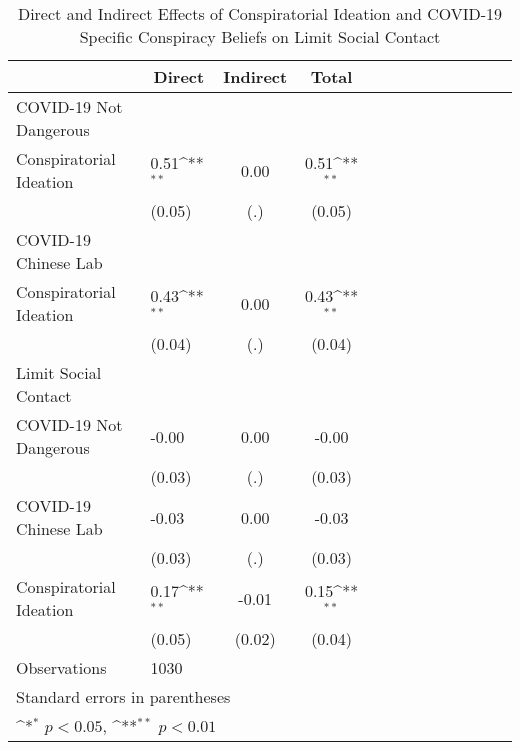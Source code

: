 \begin{table}[htbp]\centering
\def\sym#1{\ifmmode^{#1}\else\(^{#1}\)\fi}
\caption{Direct and Indirect Effects of Conspiratorial Ideation and COVID-19 Specific Conspiracy Beliefs on Limit Social Contact}
\begin{tabular}{l*{3}{l c c c}}
\hline\hline
                    &\multicolumn{1}{c}{Direct}&\multicolumn{1}{c}{Indirect}&\multicolumn{1}{c}{Total}\\
\hline
COVID-19 Not Dangerous&                    &                    &                    \\
Conspiratorial Ideation&        0.51\sym{**}&        0.00        &        0.51\sym{**}\\
                    &      (0.05)        &         (.)        &      (0.05)        \\
\hline
COVID-19 Chinese Lab&                    &                    &                    \\
Conspiratorial Ideation&        0.43\sym{**}&        0.00        &        0.43\sym{**}\\
                    &      (0.04)        &         (.)        &      (0.04)        \\
\hline
Limit Social Contact&                    &                    &                    \\
COVID-19 Not Dangerous&       -0.00        &        0.00        &       -0.00        \\
                    &      (0.03)        &         (.)        &      (0.03)        \\
[1em]
COVID-19 Chinese Lab&       -0.03        &        0.00        &       -0.03        \\
                    &      (0.03)        &         (.)        &      (0.03)        \\
[1em]
Conspiratorial Ideation&        0.17\sym{**}&       -0.01        &        0.15\sym{**}\\
                    &      (0.05)        &      (0.02)        &      (0.04)        \\
\hline
Observations        &        1030        &                    &                    \\
\hline\hline
\multicolumn{4}{l}{\footnotesize Standard errors in parentheses}\\
\multicolumn{4}{l}{\footnotesize \sym{*} \(p<0.05\), \sym{**} \(p<0.01\)}\\
\end{tabular}
\end{table}
